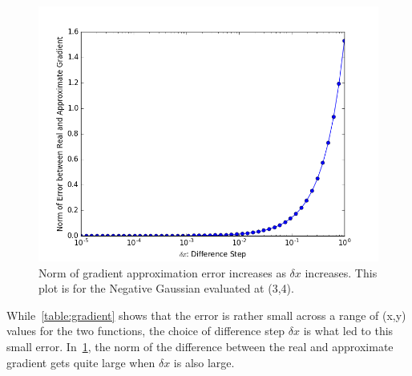 \begin{figure}
	\centering
	\includegraphics [trim=0 0 0 0, clip, angle=0, width=0.8\columnwidth,
	keepaspectratio]{figures/1_2_error}
	\caption{Norm of gradient approximation error increases as $\delta x$ increases. This plot is for the Negative Gaussian evaluated at (3,4).} 
	\label{fig:1_2_error} 
\end{figure}

While~\cref{table:gradient} shows that the error is rather small across a range of (x,y) values for the two functions, the choice of difference step $\delta x$ is what led to this small error. In~\cref{fig:1_2_error}, the norm of the difference between the real and approximate gradient gets quite large when $\delta x$ is also large.










